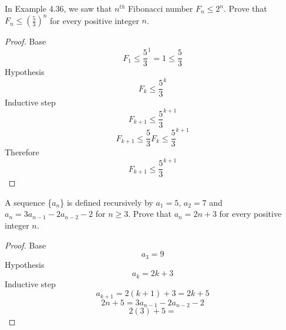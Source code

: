\documentclass{homework}
\begin{document}
\question In Example 4.36, we saw that $n^{th}$ Fibonacci number $F_{n} \leq 2^{n}$. Prove that $F_{n}\leq (\frac{5}{3})^{n}$ for every positive integer $n$.

\begin{sol}
	\begin{proof}
		Base
		\[
			F_1 \leq \frac{5}{3}^1 = 1 \leq \frac{5}{3}
		\]
		Hypothesis
		\[
			F_k \leq \frac{5}{3}^k
		\]
		Inductive step
		\[
			F_{k+1} \leq \frac{5}{3}^{k+1}
		\]
		\[
			F_{k+1}\leq\frac{5}{3}F_k\leq\frac{5}{3}^{k+1}
		\]
		Therefore
		\[
			F_{k+1} \leq \frac{5}{3}^{k+1}
		\]
	\end{proof}
\end{sol}

\question A sequence \{$a_{n}$\} is defined recursively by $a_{1} = 5$, $a_{2} = 7$ and ${a_{n} = 3a_{n-1}-2a_{n-2}-2}$ for $n\geq3$. Prove that $a_{n} = 2n + 3$ for every positive integer $n$.
\begin{sol}
	\begin{proof}
		Base
		\[
			a_3 = 9
		\]
		Hypothesis
		\[
			a_k = 2k + 3
		\]
		Inductive step
		\[
			a_{k+1} = 2(k+1) + 3 = 2k+5
		\]
		\[
			2n+5 = {3a_{n-1}-2a_{n-2}-2}
		\]
		\[
			2(3)+5 = 
		\]
	\end{proof}
\end{sol}
\end{document}
